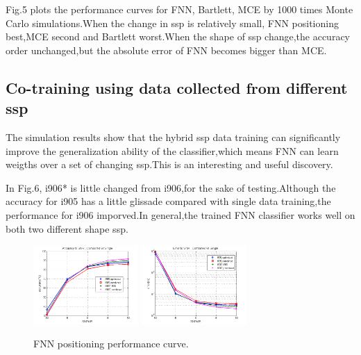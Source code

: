 Fig.5 plots the performance curves for FNN, Bartlett, MCE by 1000 times Monte Carlo simulations.When the change in ssp is relatively small, FNN positioning best,MCE second and Bartlett worst.When the shape of ssp change,the accuracy
order unchanged,but the absolute error of FNN becomes bigger than MCE.


\subsection{Co-training using data collected from different ssp}
The simulation results show that the hybrid ssp data training can significantly improve the generalization ability of the classifier,which means FNN can learn weigths over a set of changing ssp.This is an interesting and useful discovery.


In Fig.6, i906{*} is little changed from i906,for the sake of testing.Although the accuracy for i905 has a little glissade compared with single data training,the performance for i906 imporved.In general,the trained FNN classifier works well on both two different shape ssp.

\begin{figure}
\includegraphics[width=4cm,height=3cm]{figure/Accuracy_to_SNR_Combined_vs_Single}
\includegraphics[width=4cm,height=3cm]{figure/Error_to_SNR_Combined_vs_Single}
\caption{FNN positioning performance curve.}
\end{figure}

